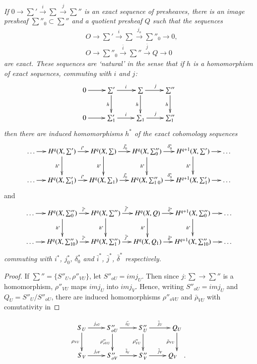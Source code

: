 \textit{If $0 \to \sum ' \xrightarrow{i} \sum \xrightarrow{j} \sum''$
  is an exact sequence of presheaves, there is an image presheaf
  $\sum''_0 \subset \sum''$ and a quotient presheaf $Q$ such that the 
  sequences} 
\begin{align*}
&O \to \sum ' \xrightarrow{i} \sum \xrightarrow{j_o} \sum''_0\to 0,\\
&O \to \sum''_0 \xrightarrow{\bar{i}}\sum'' \xrightarrow{\bar{j}} Q \to 0
\end{align*}
\textit{are exact. These sequences are `natural' in the sense that if
  $h$ is a homomorphism of exact sequences, commuting with $i$ and
  $j$:} 
\[
\xymatrix{
0\ar[r] & \sum' \ar[r]^{i}\ar[d]_h & \sum\ar[r]^{j} \ar[d]_h &
\sum''\ar[d]_h\\
0\ar[r] & \sum'_1 \ar[r]^i & \sum_1 \ar[r]^j & \sum''_1
}
\]
\textit{then there are induced homomorphisms $h^*$ of the exact
  cohomology sequences} 
{\fontsize{9}{11}\selectfont
\[
\xymatrix@C=0.45cm{
\ldots \ar[r]& H^q(X,\sum') \ar[r]^{i^{\ast}} \ar[d]_{h^{\ast}} &
H^q(X,\sum) \ar[r]^{j^{\ast}_0} \ar[d]_{h^{\ast}} & H^q(X,\sum''_0)
\ar[r]^{\delta^{\ast}_0} \ar[d]_{h^{\ast}} & H^{q+1}(X,\sum')
\ar[r]\ar[d]_{h^{\ast}} & \ldots\\
\ldots \ar[r] & H^q(X,\sum'_1) \ar[r]^{i^{\ast}} & H^q(X,\sum_1)
\ar[r]^{j^{\ast}_0} & H^q(X,\sum''_{1 \; 0}) \ar[r]^{\delta^{\ast}_0} &
H^{q+1}(X,\sum'_1) \ar[r] & \ldots
}
\]}\relax
and\pageoriginale
{\fontsize{9}{11}\selectfont
\[
\xymatrix@C=0.45cm{
\ldots \ar[r] & H^q(X,\sum''_0) \ar[r]^{\bar{i}^{\ast}}
\ar[d]_{h^{\ast}} & H^q(X,\sum'')
\ar[r]^{\bar{j}^{\ast}}\ar[d]_{h^{\ast}} &
H^q(X,Q)\ar[r]^{\bar{\delta}^{\ast}}\ar[d]_{h^{\ast}} &
H^{q+1}(X,\sum''_0) \ar[r]\ar[d]_{h^{\ast}} & \ldots\\
\ldots \ar[r] & H^q(X,\sum''_{10}) \ar[r]^{\bar{i}^{\ast}} &
H^q(X,\sum''_1) \ar[r]^{\bar{j}^{\ast}} & H^q(X,Q_1)
\ar[r]^{\bar{\delta}^{\ast}} & H^{q+1}(X,\sum''_{10}) \ar[r] & \ldots
}
\]}\relax
\textit{commuting with $i^\ast$, $j^\ast_0$, $\delta^\ast_0$ and
  $\bar{i}^\ast$, $\bar{j}^\ast$, $\bar{\delta}^\ast$ respectively.}  

\begin{proof}
If $\sum''= \{ S''_U ,\rho''_{VU} \}$, let $S''_{oU}= im j_U$. Then
since $j: \sum \to \sum''$ is a homomorphism, $\rho''_{VU}$ maps $im
j_U$ into $im j_V$. Hence, writing $S''_{oU}=im j_U$ and $Q_U=S''_U/
S''_{oU}$, there are induced homomorphisms $\rho''_{oVU}$ and $\bar
{\rho}_{VU}$ with comutativity in  
\end{proof}
\[
\xymatrix{
S_U\ar[r]^{j_{oU}} \ar[d]_{\rho_{VU}} & S''_{oU} \ar[r]^{\bar{i_U}}
\ar[d]_{\rho''_{oVU}} & S''_U \ar[r]^{\bar{j}_U}\ar[d]_{\rho''_{VU}} &
Q_U\ar[d]_{\bar{\rho}_{VU}} \\
S_V \ar[r]^{j_{oV}} & S''_{oV} \ar[r]^{\bar{i}_V} & S''_V
\ar[r]^{\bar{j}_V} & Q_V \quad .
}
\]

